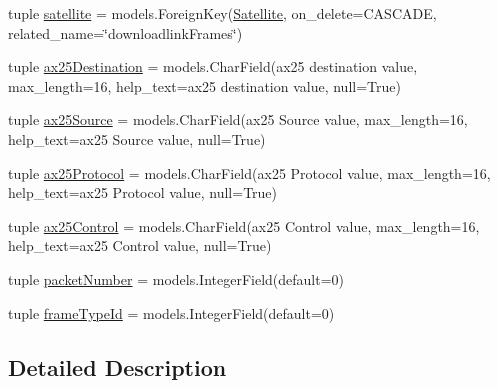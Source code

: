 \begin{DoxyCompactItemize}
\item 
tuple \hyperlink{class_ground_segment_1_1models_1_1_downlink_frame_1_1_downlink_frame_af6fd44276a5cc222f51dfc643e38911a}{satellite} = models.\+Foreign\+Key(\hyperlink{class_ground_segment_1_1models_1_1_satellite_1_1_satellite}{Satellite}, on\+\_\+delete=C\+A\+S\+C\+A\+D\+E, related\+\_\+name=\char`\"{}downloadlink\+Frames\char`\"{})
\item 
tuple \hyperlink{class_ground_segment_1_1models_1_1_downlink_frame_1_1_downlink_frame_a7a8a35f6a299797aed8e0c8f43298a6e}{ax25\+Destination} = models.\+Char\+Field(\textquotesingle{}ax25 destination value\textquotesingle{}, max\+\_\+length=16, help\+\_\+text=\textquotesingle{}ax25 destination value\textquotesingle{}, null=True)
\item 
tuple \hyperlink{class_ground_segment_1_1models_1_1_downlink_frame_1_1_downlink_frame_a64c7086161b3913498853090e1d6f721}{ax25\+Source} = models.\+Char\+Field(\textquotesingle{}ax25 Source value\textquotesingle{}, max\+\_\+length=16, help\+\_\+text=\textquotesingle{}ax25 Source value\textquotesingle{}, null=True)
\item 
tuple \hyperlink{class_ground_segment_1_1models_1_1_downlink_frame_1_1_downlink_frame_a126f980276460ccacc0d328eab3d1367}{ax25\+Protocol} = models.\+Char\+Field(\textquotesingle{}ax25 Protocol value\textquotesingle{}, max\+\_\+length=16, help\+\_\+text=\textquotesingle{}ax25 Protocol value\textquotesingle{}, null=True)
\item 
tuple \hyperlink{class_ground_segment_1_1models_1_1_downlink_frame_1_1_downlink_frame_afaf2562c951a4ba02ccf8184270caa42}{ax25\+Control} = models.\+Char\+Field(\textquotesingle{}ax25 Control value\textquotesingle{}, max\+\_\+length=16, help\+\_\+text=\textquotesingle{}ax25 Control value\textquotesingle{}, null=True)
\item 
tuple \hyperlink{class_ground_segment_1_1models_1_1_downlink_frame_1_1_downlink_frame_a7575e379aedab38dd11ab34e83ec9f41}{packet\+Number} = models.\+Integer\+Field(default=0)
\item 
tuple \hyperlink{class_ground_segment_1_1models_1_1_downlink_frame_1_1_downlink_frame_a562b48a3bb48d65dfacef680dc3622b6}{frame\+Type\+Id} = models.\+Integer\+Field(default=0)
\end{DoxyCompactItemize}


\subsection{Detailed Description}


